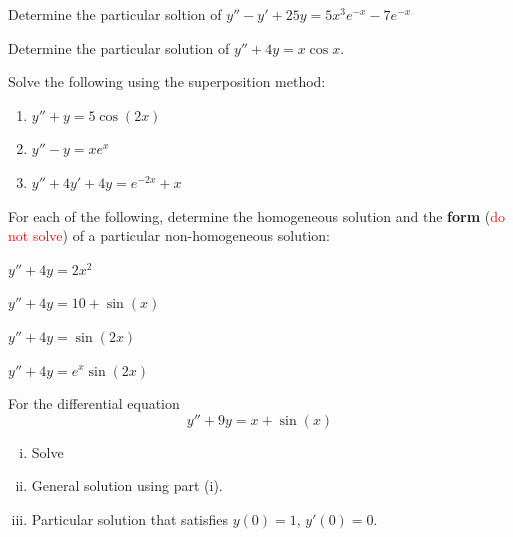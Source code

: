   \begin{question}
    Determine the particular soltion of \(y'' - y' + 25y = 5x^3e^{-x} - 7 e^{-x}\)
  \end{question}


  \begin{question}
    Determine the particular solution of \(y'' + 4y = x\cos{x}\).
  \end{question}


  \begin{question}
    Solve the following using the superposition method:
    \begin{enumerate}
      \item $y''+y=5\cos(2x)$
      \item $y''-y=xe^x$
      \item $y''+4y'+4y=e^{-2x}+x$
    \end{enumerate}
  \end{question}


  \begin{question}
    For each of the following, determine the homogeneous solution and the \textbf{form} (\textcolor{red}{do not solve}) of a 
    particular non-homogeneous solution:
    \begin{fullwidth}
      \begin{colenumerate}[2]
        \item \(y'' + 4y = 2x^{2}\)
        \item \(y'' + 4y = 10 + \sin(x)\)
        \item \(y'' + 4y = \sin(2 x)\)
        \item \(y'' + 4y = e^{x}\sin(2 x)\)
      \end{colenumerate}
      \solspace{.2in}
    \end{fullwidth}
  \end{question}


  \begin{question}
    For the differential equation
    \[
      y'' + 9y = x + \sin(x)
    \]
    \begin{enumerate}[(i)]
      \item Solve
        \solspace{.2in}
      \item General solution using part (i). 
        \solspace{0.2in}
      \item Particular solution that satisfies \(y(0)=1\), \(y'(0) = 0\).
        \solspace{.2in}
    \end{enumerate}
  \end{question}


